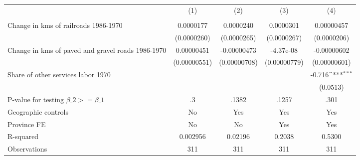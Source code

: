 {
\def\sym#1{\ifmmode^{#1}\else\(^{#1}\)\fi}
\begin{tabular}{l*{4}{c}}
\hline\hline
                &\multicolumn{1}{c}{(1)}&\multicolumn{1}{c}{(2)}&\multicolumn{1}{c}{(3)}&\multicolumn{1}{c}{(4)}\\
                &\multicolumn{1}{c}{}&\multicolumn{1}{c}{}&\multicolumn{1}{c}{}&\multicolumn{1}{c}{}\\
\hline
Change in kms of railroads 1986-1970&0.0000177         &0.0000240         &0.0000301         &0.00000457         \\
                &(0.0000260)         &(0.0000265)         &(0.0000267)         &(0.0000206)         \\
[1em]
Change in kms of paved and gravel roads 1986-1970&0.00000451         &-0.00000473         &-4.37e-08         &-0.00000602         \\
                &(0.00000551)         &(0.00000708)         &(0.00000779)         &(0.00000601)         \\
[1em]
Share of other services labor 1970&                  &                  &                  &   -0.716\sym{***}\\
                &                  &                  &                  & (0.0513)         \\
\hline
P-value for testing $\beta\_{2} >= \beta\_{1}$&       .3         &    .1382         &    .1257         &     .301         \\
Geographic controls&       No         &      Yes         &      Yes         &      Yes         \\
Province FE     &       No         &       No         &      Yes         &      Yes         \\
R-squared       & 0.002956         &  0.02196         &   0.2038         &   0.5300         \\
Observations    &      311         &      311         &      311         &      311         \\
\hline\hline
\end{tabular}
}
